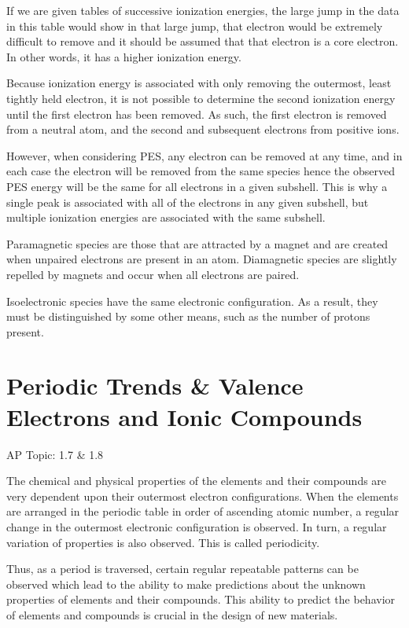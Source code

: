 \documentclass[../chem.tex]{subfiles}
\begin{document}
If we are given tables of successive ionization energies, the large jump in the data in this table would show in that large jump, that electron 
would be extremely difficult to remove and it should be assumed that that electron is a core electron. In other words, it has a higher ionization energy.

Because ionization energy is associated with only removing the outermost, least tightly held electron, it is not possible to determine the 
second ionization energy until the first electron has been removed. As such, the first electron is removed from a neutral atom, and the second and subsequent electrons from positive ions.

However, when considering PES, any electron can be removed at any time, and in each case the electron will be removed from the same species 
hence the observed PES energy will be the same for all electrons in a given subshell. This is why a single peak is associated with all of the electrons in any given 
subshell, but multiple ionization energies are associated with the same subshell.

Paramagnetic species are those that are attracted by a magnet and are created when unpaired electrons are present in an atom. 
Diamagnetic species are slightly repelled by magnets and occur when all electrons are paired.

Isoelectronic species have the same electronic configuration. As a result, they must be distinguished by some other means, such as the number of protons present.

\section{Periodic Trends \& Valence Electrons and Ionic Compounds}
AP Topic: 1.7 \& 1.8

The chemical and physical properties of the elements and their compounds are very dependent upon their outermost electron configurations. 
When the elements are arranged in the periodic table in order of ascending atomic number, a regular change in the outermost electronic configuration 
is observed. In turn, a regular variation of properties is also observed. This is called periodicity.

Thus, as a period is traversed, certain regular repeatable patterns can be observed which lead to the ability to make predictions about the unknown properties of 
elements and their compounds. This ability to predict the behavior of elements and compounds is crucial in the design of new materials.
\end{document}
